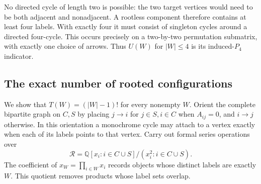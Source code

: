 \documentclass[11pt,a4paper]{article}
\numberwithin{equation}{section}
\begin{document}
No directed cycle of length two is possible: the two target vertices would need to be both adjacent and nonadjacent. A rootless component therefore contains at least four labels. With exactly four it must consist of singleton cycles around a directed four-cycle. This occurs precisely on a two-by-two permutation submatrix, with exactly one choice of arrows. Thus $U(W)$ for $|W|\le4$ is its induced-$P_4$ indicator.

\begin{center}
\end{center}
\subsection{The exact number of rooted configurations}
We show that $T(W)=(|W|-1)!$ for every nonempty $W$. Orient the complete bipartite graph on $C,S$ by placing $j\to i$ for $j\in S,i\in C$ when $A_{ij}=0$, and $i\to j$ otherwise. In this orientation a monochrome cycle may attach to a vertex exactly when each of its labels points to that vertex. Carry out formal series operations over
\[
 \mathcal R=\mathbb Q[x_i:i\in C\cup S]/(x_i^2:i\in C\cup S).
\]
The coefficient of $x_W=\prod_{i\in W}x_i$ records objects whose distinct labels are exactly $W$. This quotient removes products whose label sets overlap.
\end{document}
